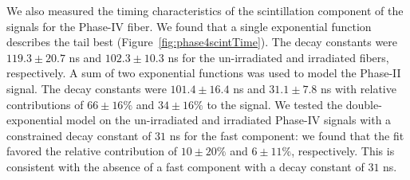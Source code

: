 \documentclass[a4paper,11pt]{article}
\begin{document}
We also measured the timing characteristics of the scintillation component of the signals for the Phase-IV fiber. We found that a single exponential function describes the tail best (Figure~\ref{fig:phase4scintTime}). The decay constants were $119.3 \pm 20.7$ ns and $102.3 \pm 10.3$ ns for the un-irradiated and irradiated fibers, respectively. A sum of two exponential functions was used to model the Phase-II signal. The decay constants were $101.4 \pm 16.4$ ns and $31.1  \pm 7.8$ ns with relative contributions of $66 \pm 16 \%$ and $34 \pm 16 \%$ to the signal. We tested the double-exponential model on the un-irradiated and irradiated Phase-IV signals with a constrained decay constant of $31$ ns for the fast component: we found that the fit favored the relative contribution of $10 \pm 20\%$ and $6 \pm 11\%$, respectively. This is consistent with the absence of a fast component with a decay constant of $31$ ns.
\end{document}
